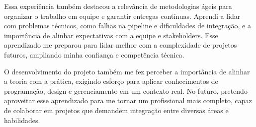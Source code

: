 Essa experiência também destacou a relevância de metodologias ágeis para
organizar o trabalho em equipe e garantir entregas contínuas. Aprendi a
lidar com problemas técnicos, como falhas na pipeline e dificuldades de
integração, e a importância de alinhar expectativas com a equipe e
stakeholders. Esse aprendizado me preparou para lidar melhor com a
complexidade de projetos futuros, ampliando minha confiança e
competência técnica.

O desenvolvimento do projeto também me fez perceber a importância de
alinhar a teoria com a prática, exigindo esforço para aplicar
conhecimentos de programação, design e gerenciamento em um contexto
real. No futuro, pretendo aproveitar esse aprendizado para me tornar um
profissional mais completo, capaz de colaborar em projetos que demandem
integração entre diversas áreas e habilidades.


